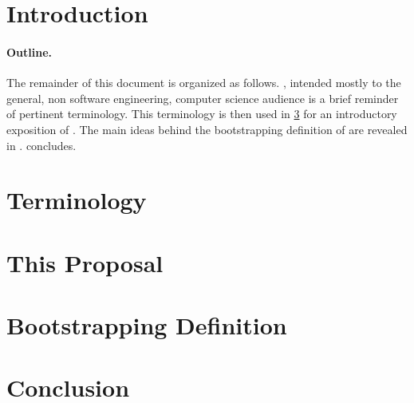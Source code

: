 \documentclass[10pt,twocolumn]{article}
\author{Tome Levy\\
	Department of Computer Science\\
	Technion---Israel Institute of Technology\\
	\texttt{\small \href{mailto:stlevy@campus.technion.ac.il}{stlevy@campus.technion.ac.il}}}
\date{
  Research Proposal\\
\small Advised by Prof.\ Yossi Gil
}
\begin{document}
\maketitle
  
\begin{abstract}
	 
\end{abstract}

\section{Introduction}


\paragraph{Outline.} 
The remainder of this document is organized as follows.
, intended mostly to the general, non software engineering, 
  computer science audience is a brief reminder of pertinent terminology.
This terminology is then used in \cref{Section:proposal} for 
  an introductory exposition of \SELF.
The main ideas behind the bootstrapping definition of \SELF 
  are revealed in . 
 concludes. 

\section{Terminology}
\label{Section:terminology}


\section{This Proposal}
\label{Section:proposal}


\section{Bootstrapping Definition}
\label{Section:boostrapping}


\section{Conclusion}
\label{Section:zz}



%

\end{document}
